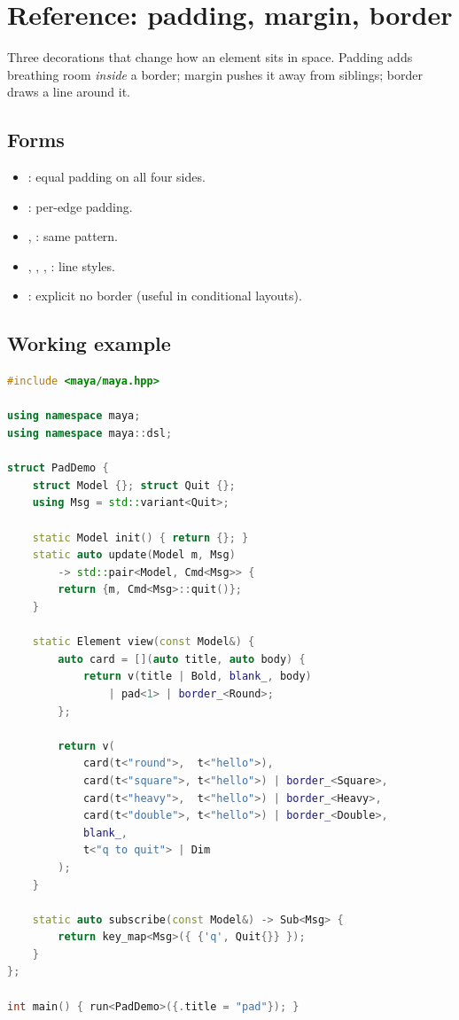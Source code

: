 \chapter{Reference: padding, margin, border}
\label{ch:refman-padding}

\begin{aside}
Three decorations that change how an element sits in space.
Padding adds breathing room \emph{inside} a border; margin
pushes it away from siblings; border draws a line around it.
\end{aside}

\section{Forms}

\begin{itemize}[leftmargin=*]
  \item {}: equal padding on all four sides.
  \item {}: per-edge padding.
  \item {}, : same
    pattern.
  \item {}, ,
    , : line
    styles.
  \item {}: explicit no border (useful in
    conditional layouts).
\end{itemize}

\section{Working example}

\begin{lstlisting}[language=C++]
#include <maya/maya.hpp>

using namespace maya;
using namespace maya::dsl;

struct PadDemo {
    struct Model {}; struct Quit {};
    using Msg = std::variant<Quit>;

    static Model init() { return {}; }
    static auto update(Model m, Msg)
        -> std::pair<Model, Cmd<Msg>> {
        return {m, Cmd<Msg>::quit()};
    }

    static Element view(const Model&) {
        auto card = [](auto title, auto body) {
            return v(title | Bold, blank_, body)
                | pad<1> | border_<Round>;
        };

        return v(
            card(t<"round">,  t<"hello">),
            card(t<"square">, t<"hello">) | border_<Square>,
            card(t<"heavy">,  t<"hello">) | border_<Heavy>,
            card(t<"double">, t<"hello">) | border_<Double>,
            blank_,
            t<"q to quit"> | Dim
        );
    }

    static auto subscribe(const Model&) -> Sub<Msg> {
        return key_map<Msg>({ {'q', Quit{}} });
    }
};

int main() { run<PadDemo>({.title = "pad"}); }
\end{lstlisting}

